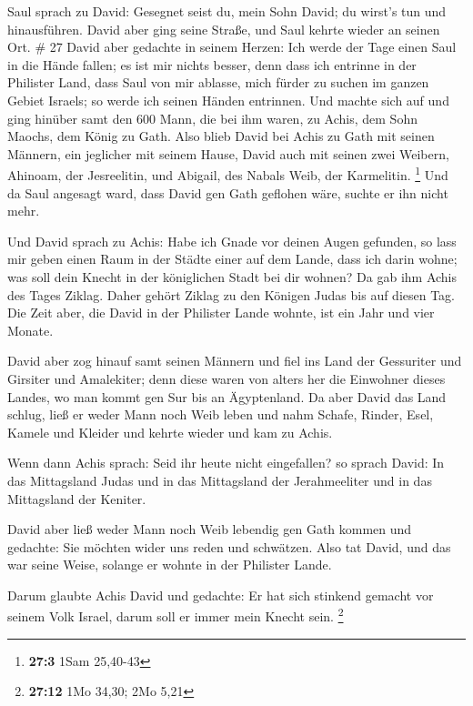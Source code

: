  Saul sprach zu David: Gesegnet seist du, mein Sohn
David; du wirst's tun und hinausführen. David aber ging seine Straße,
und Saul kehrte wieder an seinen Ort. \# 27  David aber
gedachte in seinem Herzen: Ich werde der Tage einen Saul in die Hände
fallen; es ist mir nichts besser, denn dass ich entrinne in der
Philister Land, dass Saul von mir ablasse, mich fürder zu suchen im
ganzen Gebiet Israels; so werde ich seinen Händen entrinnen.
 Und machte sich auf und ging hinüber samt den 600 Mann,
die bei ihm waren, zu Achis, dem Sohn Maochs, dem König zu Gath.
 Also blieb David bei Achis zu Gath mit seinen Männern,
ein jeglicher mit seinem Hause, David auch mit seinen zwei Weibern,
Ahinoam, der Jesreelitin, und Abigail, des Nabals Weib, der Karmelitin.
\footnote{\textbf{27:3} 1Sam 25,40-43}  Und da Saul
angesagt ward, dass David gen Gath geflohen wäre, suchte er ihn nicht
mehr.

 Und David sprach zu Achis: Habe ich Gnade vor deinen
Augen gefunden, so lass mir geben einen Raum in der Städte einer auf dem
Lande, dass ich darin wohne; was soll dein Knecht in der königlichen
Stadt bei dir wohnen?  Da gab ihm Achis des Tages Ziklag.
Daher gehört Ziklag zu den Königen Judas bis auf diesen Tag.
 Die Zeit aber, die David in der Philister Lande wohnte,
ist ein Jahr und vier Monate.

 David aber zog hinauf samt seinen Männern und fiel ins
Land der Gessuriter und Girsiter und Amalekiter; denn diese waren von
alters her die Einwohner dieses Landes, wo man kommt gen Sur bis an
Ägyptenland.  Da aber David das Land schlug, ließ er weder
Mann noch Weib leben und nahm Schafe, Rinder, Esel, Kamele und Kleider
und kehrte wieder und kam zu Achis.

 Wenn dann Achis sprach: Seid ihr heute nicht
eingefallen? so sprach David: In das Mittagsland Judas und in das
Mittagsland der Jerahmeeliter und in das Mittagsland der Keniter.

 David aber ließ weder Mann noch Weib lebendig gen Gath
kommen und gedachte: Sie möchten wider uns reden und schwätzen. Also tat
David, und das war seine Weise, solange er wohnte in der Philister
Lande.

 Darum glaubte Achis David und gedachte: Er hat sich
stinkend gemacht vor seinem Volk Israel, darum soll er immer mein Knecht
sein. \footnote{\textbf{27:12} 1Mo 34,30; 2Mo 5,21}

